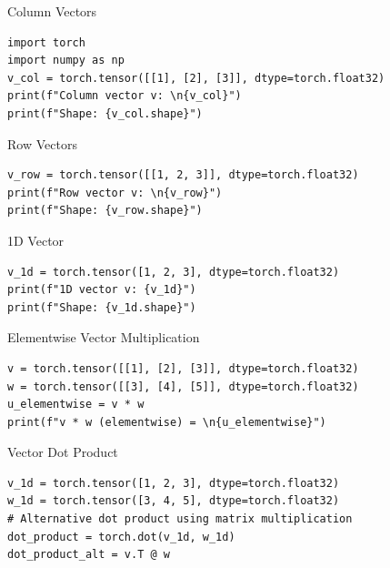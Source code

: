 \documentclass[aspectratio=169,xcolor=dvipsnames,svgnames,x11names,fleqn]{beamer}
\begin{document}
\begin{frame}[containsverbatim]{Column Vectors}
    
\begin{verbatim}
import torch
import numpy as np
v_col = torch.tensor([[1], [2], [3]], dtype=torch.float32)
print(f"Column vector v: \n{v_col}")
print(f"Shape: {v_col.shape}")
\end{verbatim}

\end{frame}


\begin{frame}[containsverbatim]{Row Vectors}
\begin{verbatim}
v_row = torch.tensor([[1, 2, 3]], dtype=torch.float32)
print(f"Row vector v: \n{v_row}")
print(f"Shape: {v_row.shape}")
\end{verbatim}
\end{frame}

\begin{frame}[containsverbatim]{1D Vector}
\begin{verbatim}
v_1d = torch.tensor([1, 2, 3], dtype=torch.float32)
print(f"1D vector v: {v_1d}")
print(f"Shape: {v_1d.shape}")

\end{verbatim}
\end{frame}

\begin{frame}[containsverbatim]{Elementwise Vector Multiplication}
\begin{verbatim}
v = torch.tensor([[1], [2], [3]], dtype=torch.float32)
w = torch.tensor([[3], [4], [5]], dtype=torch.float32)
u_elementwise = v * w
print(f"v * w (elementwise) = \n{u_elementwise}")
\end{verbatim}
\end{frame}


\begin{frame}[containsverbatim]{Vector Dot Product}
\begin{verbatim}
v_1d = torch.tensor([1, 2, 3], dtype=torch.float32)
w_1d = torch.tensor([3, 4, 5], dtype=torch.float32)
# Alternative dot product using matrix multiplication
dot_product = torch.dot(v_1d, w_1d)
dot_product_alt = v.T @ w
\end{verbatim}
\end{frame}
\end{document}
